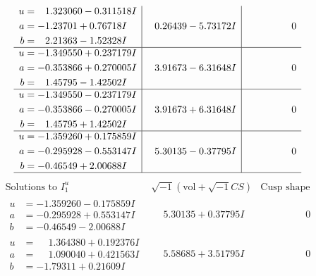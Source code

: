 \documentclass[1p]{elsarticle_modified}
\theoremstyle{definition}
\newcommand{\I}{\sqrt{-1}}
\begin{document}
$$\begin{array}{c|c|c}
\begin{aligned}
u &= \phantom{-}1.323060 - 0.311518 I \\
a &= -1.23701 + 0.76718 I \\
b &= \phantom{-}2.21363 - 1.52328 I\end{aligned}
 & \phantom{-}0.26439 - 5.73172 I & \phantom{-0.000000 } 0 \\ \hline\begin{aligned}
u &= -1.349550 + 0.237179 I \\
a &= -0.353866 + 0.270005 I \\
b &= \phantom{-}1.45795 - 1.42502 I\end{aligned}
 & \phantom{-}3.91673 - 6.31648 I & \phantom{-0.000000 } 0 \\ \hline\begin{aligned}
u &= -1.349550 - 0.237179 I \\
a &= -0.353866 - 0.270005 I \\
b &= \phantom{-}1.45795 + 1.42502 I\end{aligned}
 & \phantom{-}3.91673 + 6.31648 I & \phantom{-0.000000 } 0 \\ \hline\begin{aligned}
u &= -1.359260 + 0.175859 I \\
a &= -0.295928 - 0.553147 I \\
b &= -0.46549 + 2.00688 I\end{aligned}
 & \phantom{-}5.30135 - 0.37795 I & \phantom{-0.000000 } 0\\
 \hline 
 \end{array}$$\newpage$$\begin{array}{c|c|c}  
\text{Solutions to }I^u_{1}& \I (\text{vol} + \sqrt{-1}CS) & \text{Cusp shape}\\
 \hline 
\begin{aligned}
u &= -1.359260 - 0.175859 I \\
a &= -0.295928 + 0.553147 I \\
b &= -0.46549 - 2.00688 I\end{aligned}
 & \phantom{-}5.30135 + 0.37795 I & \phantom{-0.000000 } 0 \\ \hline\begin{aligned}
u &= \phantom{-}1.364380 + 0.192376 I \\
a &= \phantom{-}1.090040 + 0.421563 I \\
b &= -1.79311 + 0.21609 I\end{aligned}
 & \phantom{-}5.58685 + 3.51795 I & \phantom{-0.000000 } 0 \\ \hline\begin{aligned}

\end{aligned}
\end{array}$$
\end{document}
